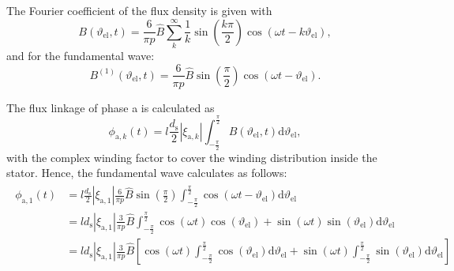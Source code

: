 \begin{solutionblock}
    The Fourier coefficient of the flux density is given with
    \begin{equation}
        B(\vartheta_{\mathrm{el}},t) = \frac{6}{\pi p} \hat{B} \sum_{k}^{\infty} \frac{1}{k} \sin\left(\frac{k\pi}{2} \right) \cos(\omega t - k \vartheta_{\mathrm{el}}),
    \end{equation}
    and for the fundamental wave:
    \begin{equation}
        B^{(1)}(\vartheta_{\mathrm{el}},t) = \frac{6}{\pi p} \hat{B} \sin\left(\frac{\pi}{2}\right) \cos(\omega t - \vartheta_{\mathrm{el}}).
    \end{equation}

    The flux linkage of phase a is calculated as
    \begin{equation}
        \phi_{\mathrm{a,}k}(t) = l \frac{d_{\mathrm{s}}}{2} |\xi_{\mathrm{a},k}| \int_{-\frac{\pi}{2}}^{\frac{\pi}{2}} B(\vartheta_{\mathrm{el}},t) \mathrm{d}\vartheta_{\mathrm{el}},
        \label{eq:phi_a_k}
    \end{equation}
    with the complex winding factor to cover the winding distribution inside the stator.
    Hence, the fundamental wave calculates as follows:
    \begin{align}
        \begin{split}
            \phi_{\mathrm{a,}1}(t) & = l \frac{d_{\mathrm{s}}}{2} |\xi_{\mathrm{a},1}|
            \frac{6}{\pi p} \hat{B} \sin\left(\frac{\pi}{2}\right) \int_{-\frac{\pi}{2}}^{\frac{\pi}{2}} \cos(\omega t - \vartheta_{\mathrm{el}}) \mathrm{d}\vartheta_{\mathrm{el}}                                                                                    \\
                                   & = l d_{\mathrm{s}} |\xi_{\mathrm{a},1}|
            \frac{3}{\pi p} \hat{B}
            \int_{-\frac{\pi}{2}}^{\frac{\pi}{2}}\cos(\omega t) \cos(\vartheta_{\mathrm{el}}) + \sin(\omega t) \sin(\vartheta_{\mathrm{el}}) \mathrm{d}\vartheta_{\mathrm{el}}                                                                                         \\
                                   & = l d_{\mathrm{s}} |\xi_{\mathrm{a},1}|
            \frac{3}{\pi p} \hat{B}
            \left[\cos(\omega t) \int_{-\frac{\pi}{2}}^{\frac{\pi}{2}} \cos(\vartheta_{\mathrm{el}}) \mathrm{d}\vartheta_{\mathrm{el}} + \sin(\omega t) \int_{-\frac{\pi}{2}}^{\frac{\pi}{2}} \sin(\vartheta_{\mathrm{el}}) \mathrm{d} \vartheta_{\mathrm{el}} \right] \\

\end{split}
\end{align}
\end{solutionblock}
